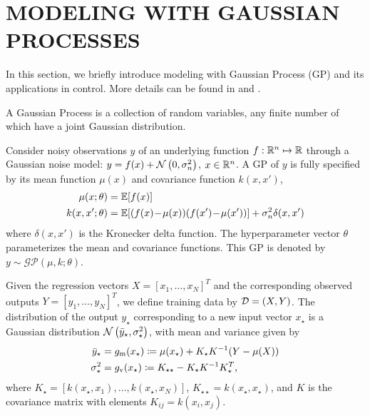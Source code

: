 \section{MODELING WITH GAUSSIAN PROCESSES}
\label{S:gp}

In this section, we briefly introduce modeling with Gaussian Process (GP) and its applications in control.
More details can be found in \cite{Rasmussen2006} %
and \cite{Kocijan2016}. %

\begin{definition}
A Gaussian Process is a collection of random variables, any finite number of which have a joint Gaussian distribution.
\end{definition}
Consider noisy observations \(y\) of an underlying function \(f: \mathbb{R}^n \mapsto \mathbb{R}\) through a Gaussian noise model: \(y = f(x) + \operatorname*{\mathcal{N}}\left(0, \sigma_n^2\right)\), \(x \in \mathbb{R}^n\).
A GP of \(y\) is fully specified by its mean function \(\mu(x)\) and covariance function \(k(x,x')\),
\begin{align}
\label{E:gp:prior}
\mu(x; \theta) &= \mathbb{E} [f(x)] \\
k(x,x'; \theta) &= \mathbb{E} [(f(x)\!-\!\mu(x)) (f(x') \!-\! \mu(x'))] + \sigma_n^2 \delta(x,x') \nonumber
\end{align}
where \(\delta(x,x')\) is the Kronecker delta function.
The hyperparameter vector \(\theta\) parameterizes the mean and covariance functions.
This GP is denoted by \(y \sim \mathcal{GP}(\mu, k; \theta)\).

Given the regression vectors \(X = [x_1, \dots, x_N]^T\) and the corresponding observed outputs \(Y = [y_1, \dots, y_N]^T\), we define training data by $\mathcal{D} = (X, Y)$. The distribution of the output \(y_\star\) corresponding to a new input vector \(x_\star\) is a Gaussian distribution \(\operatorname*{\mathcal{N}}\left(\bar{y}_\star, \sigma_\star^2\right)\), with mean and variance given by
\begin{subequations}
\label{E:gp-regression}
\begin{align}
\bar{y}_\star &= g_{\mathrm{m}} (x_{\star}) \coloneqq \mu(x_\star) + K_\star K^{-1} (Y - \mu(X))\\
\sigma_\star^2 &= g_{\mathrm{v}} (x_{\star}) \coloneqq K_{\star \star} - K_\star K^{-1} K_\star^T \text,
\end{align}
\end{subequations}
where \(K_\star = [k(x_\star, x_1), \dots, k(x_\star, x_N)]\), \(K_{\star \star} = k(x_\star, x_\star)\), and $K$ is the covariance matrix with elements \(K_{ij} = k(x_i, x_j)\).

